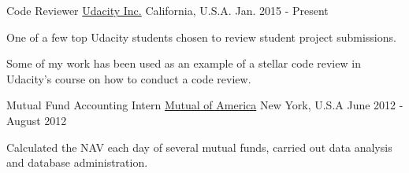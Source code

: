 \begin{cventries}
  \cventry
    {Code Reviewer}
    {\href{https://www.udacity.com/}{Udacity Inc.}}
    {California, U.S.A.}
    {Jan. 2015 - Present}
    {
      \begin{cvitems}
        \item {One of a few top Udacity students chosen to review student project submissions.}
        \item {Some of my work has been used as an example of a stellar code review in Udacity's course on how to conduct a code review.}
      \end{cvitems}
    }
  \cventry
    {Mutual Fund Accounting Intern}
    {\href{https://www.mutualofamerica.com/}{Mutual of America}}
    {New York, U.S.A}
    {June 2012 - August 2012}
    {
      \begin{cvitems}
        \item {Calculated the NAV each day of several mutual funds, carried out data analysis and database administration.}
      \end{cvitems}
    }
    
  
 
\end{cventries}


